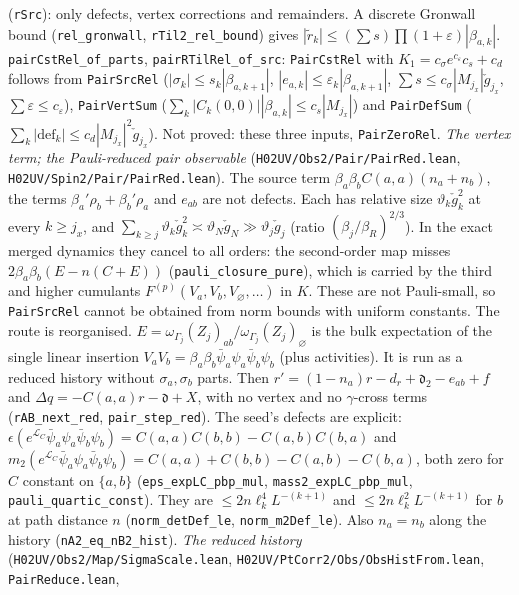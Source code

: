 \documentclass[11pt]{amsart}
\theoremstyle{definition}
\theoremstyle{remark}
\numberwithin{equation}{section}
\begin{document}
(\texttt{rSrc}): only defects, vertex corrections and remainders. A discrete Gronwall bound (\texttt{rel\_gronwall}, \texttt{rTil2\_rel\_bound})
gives $|\tilde r_k|\le(\sum s)\prod(1+\varepsilon)|\beta_{a,k}|$. \texttt{pairCstRel\_of\_parts}, \texttt{pairRTilRel\_of\_src}: \texttt{PairCstRel}
with $K_1=c_\sigma e^{c_\varepsilon}c_s+c_d$ follows from \texttt{PairSrcRel} ($|\sigma_k|\le s_k|\beta_{a,k+1}|$, $|e_{a,k}|\le\varepsilon_k|\beta_{a,k+1}|$,
$\sum s\le c_\sigma|M_{j_x}|\check g_{j_x}$, $\sum\varepsilon\le c_\varepsilon$), \texttt{PairVertSum} ($\sum_k|C_k(0,0)||\beta_{a,k}|\le c_s|M_{j_x}|$) and
\texttt{PairDefSum} ($\sum_k|\mathrm{def}_k|\le c_d|M_{j_x}|^2\check g_{j_x}$). Not proved: these three inputs, \texttt{PairZeroRel}.
\emph{The vertex term; the Pauli-reduced pair observable} (\texttt{H02UV/Obs2/Pair/PairRed.lean}, \texttt{H02UV/Spin2/Pair/PairRed.lean}). The source term
$\beta_a\beta_bC(a,a)(n_a+n_b)$, the terms $\beta_a'\rho_b+\beta_b'\rho_a$ and $e_{ab}$ are not defects. Each has relative size
$\vartheta_k\check g_k^2$ at every $k\ge j_x$, and $\sum_{k\ge j}\vartheta_k\check g_k^2\asymp\vartheta_N\check g_N\gg\vartheta_j\check g_j$
(ratio $(\beta_j/\beta_R)^{2/3}$). In the exact merged dynamics they cancel to all orders: the second-order map misses
$2\beta_a\beta_b(E-n(C+E))$ (\texttt{pauli\_closure\_pure}), which is carried by the third and higher cumulants
$F^{(p)}(V_a,V_b,V_\varnothing,\dots)$ in $K$. These are not Pauli-small, so \texttt{PairSrcRel} cannot be obtained from norm bounds with uniform
constants. The route is reorganised. $E=\omega_{\Gamma_j}(Z_j)_{ab}/\omega_{\Gamma_j}(Z_j)_\varnothing$ is the bulk expectation of the single linear insertion
$V_aV_b=\beta_a\beta_b\bar\psi_a\psi_a\bar\psi_b\psi_b$ (plus activities). It is run as a reduced history without $\sigma_a,\sigma_b$ parts. Then
$r'=(1-n_a)r-d_r+\mathfrak d_2-e_{ab}+f$ and $\Delta q=-C(a,a)r-\mathfrak d+X$, with no vertex and no $\gamma$-cross terms
(\texttt{rAB\_next\_red}, \texttt{pair\_step\_red}). The seed's defects are explicit:
$\epsilon(e^{\mathcal L_C}\bar\psi_a\psi_a\bar\psi_b\psi_b)=C(a,a)C(b,b)-C(a,b)C(b,a)$ and
$m_2(e^{\mathcal L_C}\bar\psi_a\psi_a\bar\psi_b\psi_b)=C(a,a)+C(b,b)-C(a,b)-C(b,a)$, both zero for $C$ constant on $\{a,b\}$
(\texttt{eps\_expLC\_pbp\_mul}, \texttt{mass2\_expLC\_pbp\_mul}, \texttt{pauli\_quartic\_const}). They are $\le2n\ell_k^4L^{-(k+1)}$ and
$\le2n\ell_k^2L^{-(k+1)}$ for $b$ at path distance $n$ (\texttt{norm\_detDef\_le}, \texttt{norm\_m2Def\_le}). Also $n_a=n_b$ along the history
(\texttt{nA2\_eq\_nB2\_hist}).
\emph{The reduced history} (\texttt{H02UV/Obs2/Map/SigmaScale.lean}, \texttt{H02UV/PtCorr2/Obs/ObsHistFrom.lean}, \texttt{PairReduce.lean},
\end{document}

